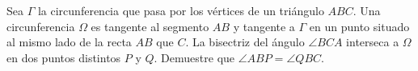 Sea $\Gamma$ la circunferencia que pasa por los vértices de un triángulo $ABC$. Una circunferencia $\Omega$ es tangente al segmento $AB$ y tangente a $\Gamma$ en un punto situado al mismo lado de la recta
$AB$ que $C$. La bisectriz del ángulo $\angle BCA$ interseca a $\Omega$ en dos puntos distintos $P$ y $Q$.
Demuestre que $\angle ABP = \angle QBC$.